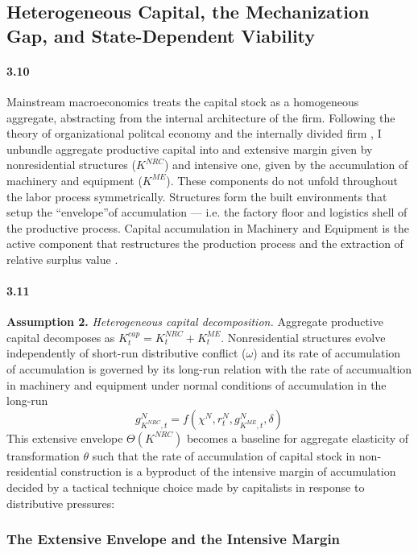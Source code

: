 \subsection{Heterogeneous Capital, the Mechanization Gap,
	and State-Dependent Viability}

\paragraph{3.10}
Mainstream macroeconomics treats the capital stock as a
homogeneous aggregate, abstracting from the internal
architecture of the firm. Following the theory of organizational politcal economy and the internally divided firm \citep{Vidal2022}, I unbundle
aggregate productive capital into and extensive margin given by nonresidential
structures ($K^{NRC}$) and intensive one, given by the accumulation of machinery and equipment ($K^{ME}$).
These components do not unfold throughout the labor process
symmetrically. Structures form the built environments that setup the 
``envelope''of accumulation --- i.e. the factory floor and logistics shell of the productive process. Capital accumulation in Machinery and Equipment 
is the active component that restructures the production process and the extraction of 
relative surplus value \citep[Vol.~I, Ch.~15]{MarxKVI}.

\paragraph{3.11}
\textbf{Assumption 2.} \textit{Heterogeneous capital
	decomposition.} Aggregate productive capital decomposes as
$K^{cap}_t = K^{NRC}_t + K^{ME}_t$. Nonresidential
structures evolve independently of short-run distributive
conflict ($\omega$) and its rate of accumulation of accumulation is governed by its long-run relation with the rate of accumualtion in machinery and equipment under normal conditions of accumulation in the long-run 
\begin{equation}
	g_{K^{NRC}, t}^N = f(\chi^N,r^N_t,g_{K^{ME}, t}^N,\delta) 
	\label{eq:32:gKNRC}
\end{equation}
This extensive envelope $\Theta(K^{NRC})$ becomes a baseline for aggregate elasticity of transformation $\theta$ such that the rate of accumulation of capital stock in non-residential construction is a byproduct of the intensive margin of accumulation decided by a tactical technique choice made by capitalists in response to distributive pressures:

\subsubsection{The Extensive Envelope and the Intensive Margin}

